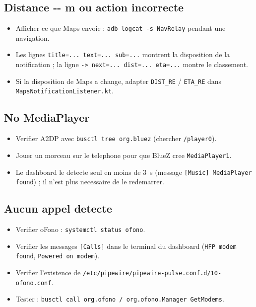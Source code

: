 \documentclass[a4paper,11pt]{article}
\begin{document}
\subsection{Distance \og -{}- m\fg{} ou action incorrecte}

\begin{itemize}
  \item Afficher ce que Maps envoie : \texttt{adb logcat -s NavRelay} pendant une navigation.
  \item Les lignes \texttt{title=... text=... sub=...} montrent la disposition de la
    notification ; la ligne \texttt{-> next=... dist=... eta=...} montre le classement.
  \item Si la disposition de Maps a change, adapter \texttt{DIST\_RE} / \texttt{ETA\_RE}
    dans \texttt{MapsNotificationListener.kt}.
\end{itemize}

\subsection{\og No MediaPlayer\fg{}}

\begin{itemize}
  \item Verifier A2DP avec \texttt{busctl tree org.bluez} (chercher \texttt{/player0}).
  \item Jouer un morceau sur le telephone pour que BlueZ cree \texttt{MediaPlayer1}.
  \item Le dashboard le detecte seul en moins de 3~s (message \texttt{[Music] MediaPlayer found}) ;
    il n'est plus necessaire de le redemarrer.
\end{itemize}

\subsection{Aucun appel detecte}

\begin{itemize}
  \item Verifier oFono : \texttt{systemctl status ofono}.
  \item Verifier les messages \texttt{[Calls]} dans le terminal du dashboard
    (\texttt{HFP modem found}, \texttt{Powered on modem}).
  \item Verifier l'existence de \texttt{/etc/pipewire/pipewire-pulse.conf.d/10-ofono.conf}.
  \item Tester : \texttt{busctl call org.ofono / org.ofono.Manager GetModems}.
\end{itemize}
\end{document}
